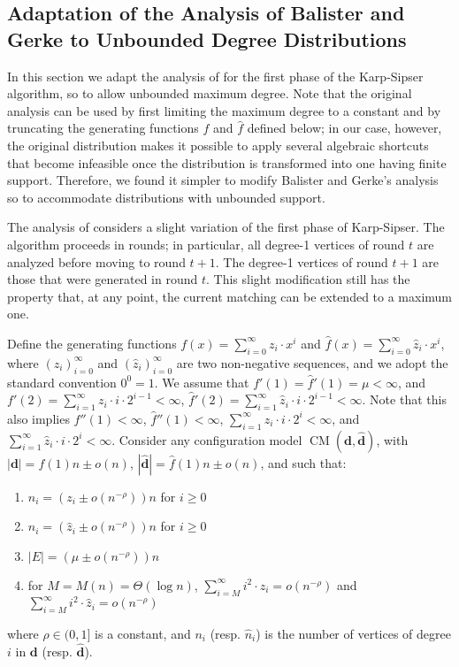 \documentclass[11pt]{article}
\DeclareMathOperator*{\CM}{CM}
\newcommand{\maxdeg}{M}
\begin{document}
\begin{toappendix}
    \section{Adaptation of the Analysis of Balister and Gerke to Unbounded Degree Distributions}\label{app:bg}
In this section we adapt the analysis of \cite{bg15} for the first phase of the Karp-Sipser algorithm, so to allow unbounded maximum degree. Note that the original analysis can be used by first limiting the maximum degree to a constant and by truncating the generating functions $f$ and $\hat{f}$ defined below;
in our case, however, the original distribution makes it possible to apply several algebraic shortcuts that become infeasible once the distribution is transformed into one having finite support. Therefore, we found it simpler to modify Balister and Gerke's analysis so to  accommodate  distributions with unbounded support.

\smallskip

The analysis of \cite{bg15} considers a slight variation of the first phase of Karp-Sipser. The algorithm proceeds in rounds; in particular, all degree-1 vertices of round $t$ are analyzed before moving to round $t+1$. The degree-1 vertices of round $t+1$ are those that were generated in round $t$. This slight modification still has the property that, at any point, the current matching can be extended to a maximum one. 

Define the generating functions $f(x)=\sum_{i=0}^\infty z_i \cdot x^i$ and $\hat{f}(x)=\sum_{i=0}^\infty \hat{z}_i\cdot x^i$, where $(z_i)_{i=0}^\infty$ and $(\hat{z}_i)_{i=0}^\infty$ are two non-negative sequences, and we adopt the standard convention $0^0=1$. We assume that $f'(1)=\hat{f}'(1)=\mu < \infty$, and $f'(2) = \sum_{i=1}^\infty z_i \cdot i \cdot 2^{i-1} < \infty$, $\hat{f}'(2) = \sum_{i=1}^\infty \hat{z}_i \cdot i \cdot 2^{i-1} < \infty$. Note that this also implies $f''(1)<\infty$, $\hat{f}''(1)<\infty$, $\sum_{i=1}^\infty z_i \cdot i \cdot 2^i < \infty$, and $\sum_{i=1}^\infty \hat{z}_i \cdot i \cdot 2^i < \infty$. Consider any configuration model $\CM(\mathbf{d}, \mathbf{\hat{d}})$, with $|\mathbf{d}|=f(1)n\pm o(n)$,  $|\mathbf{\hat{d}}|=\hat{f}(1)n \pm o(n)$, and such that:
\begin{enumerate}
\item $n_i=(z_i\pm o(n^{-\rho}))n$ for $i\geq 0$
\item $\hat{n}_i=(\hat{z}_i \pm o(n^{-\rho}))n$ for $i\geq 0$
\item $|E|=(\mu \pm o(n^{-\rho}))n$
\item for $\maxdeg=\maxdeg(n)=\Theta(\log n)$, $\sum_{i=\maxdeg}^\infty i^2 \cdot z_i = o(n^{-\rho})$ and $\sum_{i=\maxdeg}^\infty i^2 \cdot \hat{z}_i = o(n^{-\rho})$
\end{enumerate}
where $\rho\in(0,1]$ is a constant, and $n_i$ (resp. $\hat{n}_i$) is the number of vertices of degree $i$ in $\mathbf{d}$ (resp. $\mathbf{\hat{d}}$).


\end{toappendix}
\end{document}
